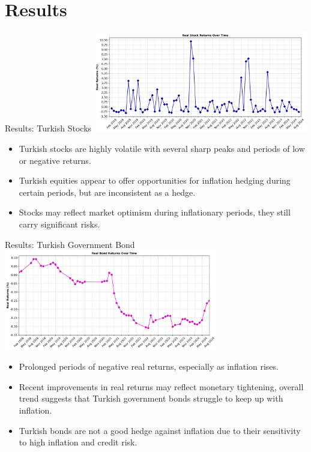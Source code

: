 \documentclass{beamer}
\begin{document}
\section{Results}
\begin{frame}{Results: Turkish Stocks}
\includegraphics[width=0.7\textwidth]{real_stock_returns.png}
\begin{itemize}
\item Turkish stocks are highly volatile with several sharp peaks and periods of low or negative returns.
\item Turkish equities appear to offer opportunities for inflation hedging during certain periods, but are inconsistent as a hedge.
\item Stocks may reflect market optimism during inflationary periods, they still carry significant risks.
\end{itemize}
\end{frame}

\begin{frame}{Results: Turkish Government Bond}
\includegraphics[width=0.7\textwidth]{real_bond_returns.png}
\begin{itemize}
\item Prolonged periods of negative real returns, especially as inflation rises.
\item Recent improvements in real returns may reflect monetary tightening, overall trend suggests that Turkish government bonds struggle to keep up with inflation.
\item Turkish bonds are not a good hedge against inflation due to their sensitivity to high inflation and credit risk.
\end{itemize}
\end{frame}
\end{document}
